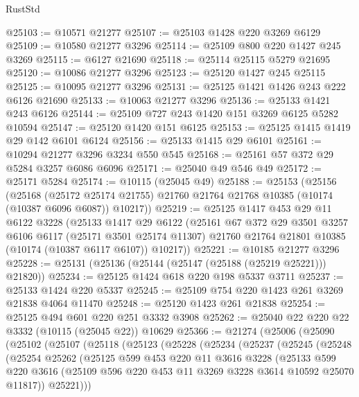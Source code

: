 \begin{lexlean}{RustStd}
\begin{coremodule}
@25103 := @10571 @21277
@25107 := @25103 @1428 @220 @3269 @6129
@25109 := @10580 @21277 @3296
@25114 := @25109 @800 @220 @1427 @245 @3269
@25115 := @6127 @21690
@25118 := @25114 @25115 @5279 @21695
@25120 := @10086 @21277 @3296
@25123 := @25120 @1427 @245 @25115
@25125 := @10095 @21277 @3296
@25131 := @25125 @1421 @1426 @243 @222 @6126 @21690
@25133 := @10063 @21277 @3296
@25136 := @25133 @1421 @243 @6126
@25144 := @25109 @727 @243 @1420 @151 @3269 @6125 @5282 @10594
@25147 := @25120 @1420 @151 @6125
@25153 := @25125 @1415 @1419 @29 @142 @6101 @6124
@25156 := @25133 @1415 @29 @6101
@25161 := @10294 @21277 @3296 @3234 @550 @545
@25168 := @25161 @57 @372 @29 @5284 @3257 @6086 @6096
@25171 := @25040 @49 @546 @49
@25172 := @25171 @5284
@25174 := @10115 (@25045 @49)
@25188 := @25153
    (@25156
      (@25168
        (@25172 @25174 @21755)
        @21760
        @21764
        @21768
        @10385
        (@10174 (@10387 @6096 @6087))
        @10217))
@25219 := @25125
    @1417
    @453
    @29
    @11
    @6122
    @3228
    (@25133
      @1417
      @29
      @6122
      (@25161
        @67
        @372
        @29
        @3501
        @3257
        @6106
        @6117
        (@25171 @3501 @25174 @11307)
        @21760
        @21764
        @21801
        @10385
        (@10174 (@10387 @6117 @6107))
        @10217))
@25221 := @10185 @21277 @3296
@25228 := @25131 (@25136 (@25144 (@25147 (@25188 (@25219 @25221))) @21820))
@25234 := @25125 @1424 @618 @220 @198 @5337 @3711
@25237 := @25133 @1424 @220 @5337
@25245 := @25109 @754 @220 @1423 @261 @3269 @21838 @4064 @11470
@25248 := @25120 @1423 @261 @21838
@25254 := @25125 @494 @601 @220 @251 @3332 @3908
@25262 := @25040 @22 @220 @22 @3332 (@10115 (@25045 @22)) @10629
@25366 := @21274
    (@25006
      (@25090
        (@25102
          (@25107
            (@25118
              (@25123
                (@25228
                  (@25234
                    (@25237
                      (@25245
                        (@25248
                          (@25254
                            @25262
                            (@25125
                              @599
                              @453
                              @220
                              @11
                              @3616
                              @3228
                              (@25133
                                @599
                                @220
                                @3616
                                (@25109 @596 @220 @453 @11 @3269 @3228 @3614 @10592 @25070 @11817))
                              @25221)))

\end{coremodule}
\end{lexlean}
